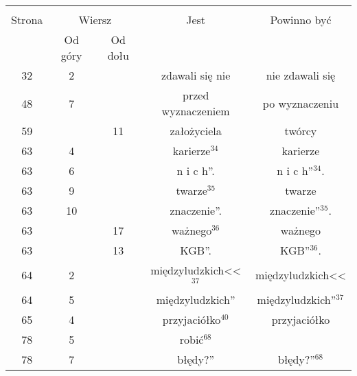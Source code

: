 \documentclass[a4paper,11pt]{article}
\begin{document}
\begin{center}
  \begin{tabular}{|c|c|c|c|c|}
    \hline
    & \multicolumn{2}{c|}{} & & \\
    Strona & \multicolumn{2}{c|}{Wiersz} & Jest
                              & Powinno być \\ \cline{2-3}
    & Od góry & Od dołu & & \\
    \hline
    32 &  2 & & zdawali się nie & nie zdawali się \\
    48 &  7 & & przed wyznaczeniem & po wyznaczeniu \\
    59 & & 11 & założyciela & twórcy \\
    63 &  4 & & karierze$^{ 34 }$ & karierze \\
    63 &  6 & & n i c h''. & n i c h''$^{ 34 }$. \\
    63 &  9 & & twarze$^{ 35 }$ & twarze \\
    63 & 10 & & znaczenie''. & znaczenie''$^{ 35 }$. \\
    63 & & 17 & ważnego$^{ 36 }$ & ważnego \\
    63 & & 13 & KGB''. & KGB''$^{ 36 }$. \\
    64 &  2 & & międzyludzkich<<$^{ 37 }$ & międzyludzkich<< \\
    64 &  5 & & międzyludzkich'' & międzyludzkich''$^{ 37 }$ \\
    65 &  4 & & przyjaciółko$^{ 40 }$ & przyjaciółko \\
    78 &  5 & & robić$^{ 68 }$ & \\
    78 &  7 & & błędy?'' & błędy?''$^{ 68 }$ \\
    \hline
  \end{tabular}
\end{center}

\vspace{\spaceTwo}





\newpage
{}

\vspace{\spaceTwo} \vspace{\spaceThree}



\end{document}
